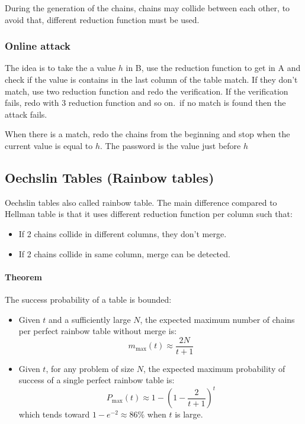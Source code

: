 During the generation of the chains, chains may collide between each other, to
avoid that, different reduction function must be used.
\subsubsection{Online attack}
The idea is to take the a value $h$ in B, use the reduction function to get in A
and check if the value is contains in the last column of the table match.
If they don't match, use two reduction function and redo the verification.
If the verification fails, redo with 3 reduction function and so on.\ if
no match is found then the attack fails.

When there is a match, redo the chains from the beginning and stop when the
current value is equal to $h$. The password is the value just before $h$

\subsection{Oechslin Tables (Rainbow tables)}
Oechslin tables also called rainbow table. The main difference compared to
Hellman table is that it uses different reduction function per column such that:

\begin{itemize}
    \item If 2 chains collide in different columns, they don't merge.
    \item If 2 chains collide in same column, merge can be detected.
\end{itemize}

\paragraph{Theorem} The success probability of a table is bounded:
\begin{itemize}
    \item
    Given $t$ and a sufficiently large $N$, the expected maximum number of
    chains per perfect rainbow table without merge is:
    $$ m_{\max}(t)\approx\frac{2N}{t+1} $$
    \item
    Given $t$, for any problem of size $N$, the expected maximum probability of
    success of a single perfect rainbow table is:
    $$ P_{\max}(t)\approx 1 - (1-\frac{2}{t+1})^t $$
    which tends toward $ 1 - e^{-2}\approx 86\% $ when $t$ is large.

\end{itemize}


